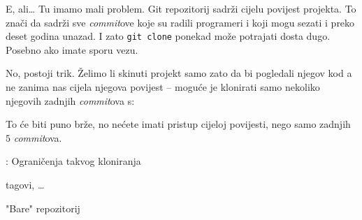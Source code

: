 E, ali\dots
Tu imamo mali problem.
Git repozitorij sadrži cijelu povijest projekta. 
To znači da sadrži sve \emph{commit}ove koje su radili programeri i koji mogu sezati i preko deset godina unazad.
I zato \verb+git clone+ ponekad može potrajati dosta dugo. 
Posebno ako imate sporu vezu.

No, postoji trik.
Želimo li skinuti projekt samo zato da bi pogledali njegov kod a ne zanima nas cijela njegova povijest -- moguće je klonirati samo nekoliko njegovih zadnjih \emph{commit}ova s:


To će biti puno brže, no nećete imati pristup cijeloj povijesti, nego samo zadnjih $5$ \emph{commit}ova.

\TODO: Ograničenja takvog kloniranja

tagovi, \dots

\TODO "Bare" repozitorij


